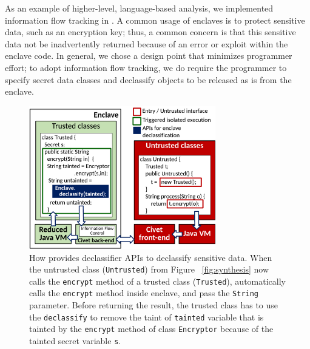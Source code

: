 As an example of higher-level, language-based analysis, we implemented information flow tracking
in \sysname{}.
A common usage of enclaves is to protect sensitive data, such as an encryption key;
thus, a common concern is that this sensitive data not be inadvertently returned because of an error or exploit within the enclave code.
In general, we chose a design point that minimizes programmer effort; to adopt information flow tracking, we
do require the programmer to specify secret data classes and declassify objects to be released as is from the enclave.

\begin{figure}[t!]
\centering
\includegraphics[width=3.2in]{civet/figures/declassify.pdf}
\footnotesize
\caption[\sysname{}: declassifier APIs.]
{How \sysname{} provides declassifier APIs to declassify sensitive data.
When the untrusted class ({\tt Untrusted}) from Figure ~\ref{fig:synthesis} now calls the {\tt encrypt} method of a trusted class ({\tt Trusted}),
\sysname{} automatically calls the {\tt encrypt} method inside enclave, and pass the {\tt String} parameter.
Before returning the result, the trusted class has to use the {\tt declassify} to remove the taint of {\tt tainted} variable that is tainted by the {\tt encrypt} method of class {\tt Encryptor} because of the tainted secret variable {\tt s}.
}
\label{fig:declassify}
\end{figure}


